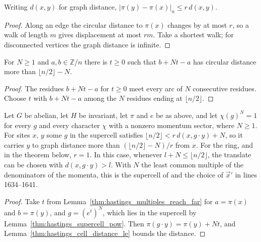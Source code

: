 \begin{lemma}
    \label{thm:hastings_cell_distance_le}
    \leanok
    Writing $d(x,y)$ for graph distance,
    $|\pi(y)-\pi(x)|_n\le r\,d(x,y)$.
\end{lemma}
\begin{proof}\leanok
    Along an edge the circular distance to $\pi(x)$ changes by at most $r$,
    so a walk of length $m$ gives displacement at most $rm$. Take a shortest
    walk; for disconnected vertices the graph distance is infinite.
\end{proof}

\begin{lemma}
    \label{thm:hastings_multiples_reach_far}
    \leanok
    For $N\ge1$ and $a,b\in\mathbb{Z}/n$ there is $t\ge0$ such that $b+Nt-a$
    has circular distance more than $\lfloor n/2\rfloor-N$.
\end{lemma}
\begin{proof}\leanok
    The residues $b+Nt-a$ for $t\ge0$ meet every arc of $N$ consecutive
    residues. Choose $t$ with $b+Nt-a$ among the $N$ residues ending at
    $\lfloor n/2\rfloor$.
\end{proof}

\begin{lemma}
    \label{thm:hastings_supercell_far}
    \leanok
    Let $G$ be abelian, let $H$ be invariant, let $\pi$ and $e$ be as above, and
    let $\chi(g)^N=1$ for every $g$ and every character $\chi$ with a nonzero
    momentum sector, where $N\ge1$. For sites $x$, $y$ some $g$ in the supercell
    satisfies $\lfloor n/2\rfloor<r\,d(x,g\cdot y)+N$, so it carries $y$ to
    graph distance more than $(\lfloor n/2\rfloor-N)/r$ from $x$. For the ring,
    and in the theorem below, $r=1$. In this case, whenever
    $l+N\le\lfloor n/2\rfloor$, the translate can be chosen with
    $d(x,g\cdot y)>l$. With $N$ the least common multiple of the
    denominators of the momenta, this is the supercell
    of \cite[lines 1620--1630]{Hastings2006Solving} and the choice of
    $\vec x'$ in lines 1634--1641.
\end{lemma}
\begin{proof}\leanok
    Take $t$ from Lemma~\ref{thm:hastings_multiples_reach_far} for $a=\pi(x)$ and
    $b=\pi(y)$, and $g=(e^t)^N$, which lies in the supercell by
    Lemma~\ref{thm:hastings_supercell_pow}. Then $\pi(g\cdot y)=\pi(y)+Nt$, and
    Lemma~\ref{thm:hastings_cell_distance_le} bounds the distance.
\end{proof}

